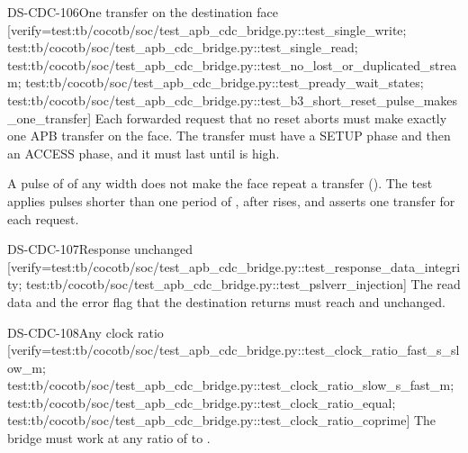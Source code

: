 \begin{requirement}{DS-CDC-106}{One transfer on the destination face}
[verify={test:tb/cocotb/soc/test_apb_cdc_bridge.py::test_single_write; test:tb/cocotb/soc/test_apb_cdc_bridge.py::test_single_read; test:tb/cocotb/soc/test_apb_cdc_bridge.py::test_no_lost_or_duplicated_stream; test:tb/cocotb/soc/test_apb_cdc_bridge.py::test_pready_wait_states; test:tb/cocotb/soc/test_apb_cdc_bridge.py::test_b3_short_reset_pulse_makes_one_transfer}]
Each forwarded request that no reset aborts must make exactly one APB transfer on the  face. The transfer must have a SETUP phase and then an ACCESS phase, and it must last until  is high.
\end{requirement}
\begin{information}
A pulse of  of any width does not make the  face repeat a transfer (). The test  applies pulses shorter than one period of , after  rises, and asserts one transfer for each request.
\end{information}

\begin{requirement}{DS-CDC-107}{Response unchanged}
[verify={test:tb/cocotb/soc/test_apb_cdc_bridge.py::test_response_data_integrity; test:tb/cocotb/soc/test_apb_cdc_bridge.py::test_pslverr_injection}]
The read data and the error flag that the destination returns must reach  and  unchanged.
\end{requirement}

\begin{requirement}{DS-CDC-108}{Any clock ratio}
[verify={test:tb/cocotb/soc/test_apb_cdc_bridge.py::test_clock_ratio_fast_s_slow_m; test:tb/cocotb/soc/test_apb_cdc_bridge.py::test_clock_ratio_slow_s_fast_m; test:tb/cocotb/soc/test_apb_cdc_bridge.py::test_clock_ratio_equal; test:tb/cocotb/soc/test_apb_cdc_bridge.py::test_clock_ratio_coprime}]
The bridge must work at any ratio of  to .
\end{requirement}

